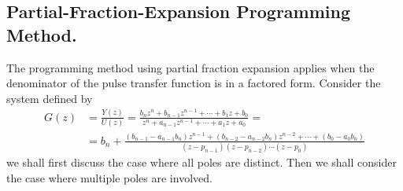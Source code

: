 \documentclass[11pt,a4paper,oneside]{book}
\numberwithin{equation}{section}
\theoremstyle{it}
\theoremstyle{definition}
\begin{document}
\subsection{Partial-Fraction-Expansion Programming Method.} The programming 
method using partial fraction expansion applies when the denominator of the 
pulse transfer function is in a factored form.
Consider the system defined by
\begin{equation}\label{pfepm_eq_1}
	\begin{aligned}
		G(z)&=\frac{Y(z)}{U(z)} = \frac{b_nz^n+b_{n-1}z^{n-1}+ \cdots +b_1z+b_0}{z^n+a_{n-1}z^{n-1}+ \cdots +a_1z+a_0} = \\[6pt]
		&= b_n+\frac{(b_{n-1}-a_{n-1}b_n)z^{n-1}+(b_{n-2}-a_{n-2}b_n)z^{n-2}+\cdots+(b_0-a_0b_n)}{(z-p_{n-1})(z-p_{n-2})\cdots(z-p_{0})}
	\end{aligned}
\end{equation}
we shall first discuss the case where all poles are distinct. Then we shall consider the case where multiple poles are involved.
\end{document}
